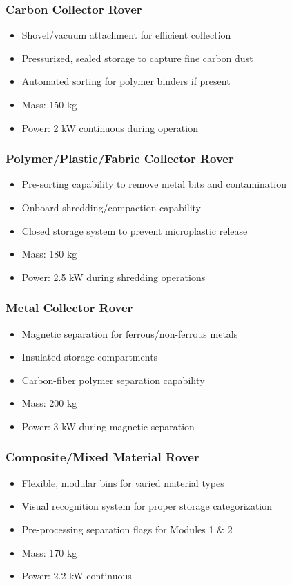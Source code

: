 \documentclass[12pt, a4paper]{article}
\begin{document}
\subsubsection{Carbon Collector Rover}
\begin{itemize}
    \item Shovel/vacuum attachment for efficient collection
    \item Pressurized, sealed storage to capture fine carbon dust
    \item Automated sorting for polymer binders if present
    \item Mass: 150 kg
    \item Power: 2 kW continuous during operation
\end{itemize}

\subsubsection{Polymer/Plastic/Fabric Collector Rover}
\begin{itemize}
    \item Pre-sorting capability to remove metal bits and contamination
    \item Onboard shredding/compaction capability
    \item Closed storage system to prevent microplastic release
    \item Mass: 180 kg
    \item Power: 2.5 kW during shredding operations
\end{itemize}

\subsubsection{Metal Collector Rover}
\begin{itemize}
    \item Magnetic separation for ferrous/non-ferrous metals
    \item Insulated storage compartments
    \item Carbon-fiber polymer separation capability
    \item Mass: 200 kg
    \item Power: 3 kW during magnetic separation
\end{itemize}

\subsubsection{Composite/Mixed Material Rover}
\begin{itemize}
    \item Flexible, modular bins for varied material types
    \item Visual recognition system for proper storage categorization
    \item Pre-processing separation flags for Modules 1 \& 2
    \item Mass: 170 kg
    \item Power: 2.2 kW continuous
\end{itemize}
\end{document}
